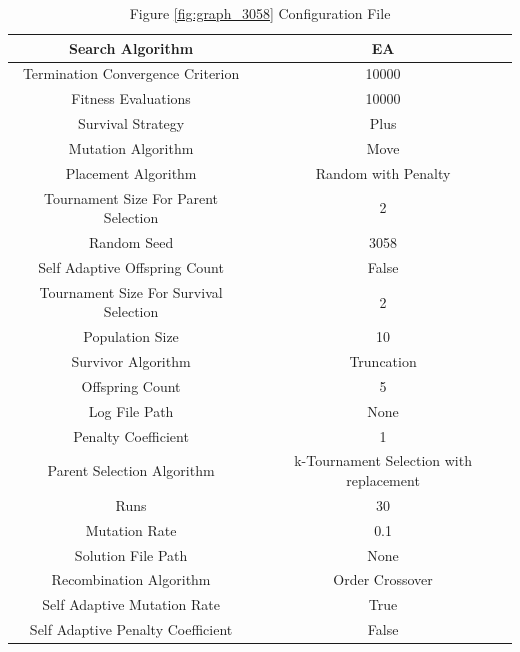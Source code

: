 \documentclass{standalone}
\begin{document}
\begin{table}[!htb]
	\centering
	\caption{Figure \ref{fig:graph_3058} Configuration File}
	\label{tab:graph_3058}
	\begin{tabular}{| c | c |}
		\hline
		Search Algorithm		& EA		 \\
		\hline
		Termination Convergence Criterion		& 10000		 \\
		\hline
		Fitness Evaluations		& 10000		 \\
		\hline
		Survival Strategy		& Plus		 \\
		\hline
		Mutation Algorithm		& Move		 \\
		\hline
		Placement Algorithm		& Random with Penalty		 \\
		\hline
		Tournament Size For Parent Selection		& 2		 \\
		\hline
		Random Seed		& 3058		 \\
		\hline
		Self Adaptive Offspring Count		& False		 \\
		\hline
		Tournament Size For Survival Selection		& 2		 \\
		\hline
		Population Size		& 10		 \\
		\hline
		Survivor Algorithm		& Truncation		 \\
		\hline
		Offspring Count		& 5		 \\
		\hline
		Log File Path		& None		 \\
		\hline
		Penalty Coefficient		& 1		 \\
		\hline
		Parent Selection Algorithm		& k-Tournament Selection with replacement		 \\
		\hline
		Runs		& 30		 \\
		\hline
		Mutation Rate		& 0.1		 \\
		\hline
		Solution File Path		& None		 \\
		\hline
		Recombination Algorithm		& Order Crossover		 \\
		\hline
		Self Adaptive Mutation Rate		& True		 \\
		\hline
		Self Adaptive Penalty Coefficient		& False		 \\
		\hline
	\end{tabular}
\end{table}
\end{document}
